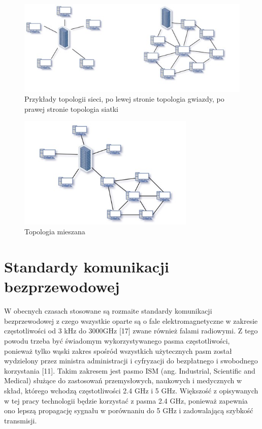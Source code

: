 \documentclass[12pt, twoside, openany]{mwrep}
\begin{document}
\begin{figure}[H]
\centering
\includegraphics[width=\textwidth]{gwiazda_siatka}
\caption{Przykłady topologii sieci, po lewej stronie topologia gwiazdy, po prawej stronie topologia siatki}
\end{figure}
\hfill \break
\begin{figure}[H]
\centering
\includegraphics[width=0.75\textwidth]{mieszana}
\caption{Topologia mieszana}
\end{figure}

\section{Standardy komunikacji bezprzewodowej}

W obecnych czasach stosowane są rozmaite standardy komunikacji bezprzewodowej z czego wszystkie oparte są o fale elektromagnetyczne w zakresie częstotliwości od 3 kHz do 3000GHz [17] zwane również falami radiowymi. Z tego powodu trzeba być świadomym wykorzystywanego pasma częstotliwości, ponieważ tylko wąski zakres spośród wszystkich użytecznych pasm został wydzielony przez ministra administracji i cyfryzacji do bezpłatnego i swobodnego korzystania [11]. Takim zakresem jest pasmo ISM (ang. Industrial, Scientific and Medical) służące do zastosowań przemysłowych, naukowych i medycznych w skład, którego wchodzą częstotliwości 2.4 GHz i 5 GHz. Większość z opisywanych w tej pracy technologii będzie korzystać z pasma 2.4 GHz, ponieważ zapewnia ono lepszą propagację sygnału w porównaniu do 5 GHz i zadowalającą szybkość transmisji.
\end{document}
